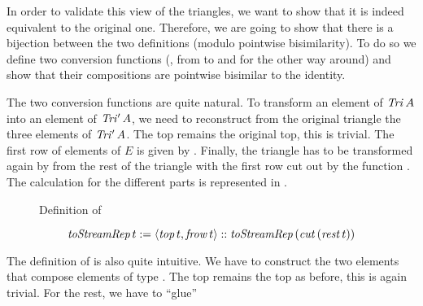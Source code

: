 In order to validate this view of the triangles, we want to show that
it is indeed equivalent to the original one. Therefore, we are going
to show that there is a bijection between the two definitions (modulo
pointwise bisimilarity). To do so we define two conversion functions
(\tSR{}, from \Tri{} to \TriS{} and \fSR{} for the other way around) and show that their
compositions are pointwise bisimilar to the identity.

The two conversion functions are quite natural. To transform an
element of $\mathit{Tri}\,A$ into an element of $\mathit{Tri'}\,A$, we need to reconstruct from
the original triangle the three elements of $\mathit{Tri'}\,A$. The top remains
the original top, this is trivial. The first row of elements of $E$ is given by \frow. Finally,
the triangle has to be transformed again by \tSR{} from the rest of
the triangle with the first row cut out by the function \cut. The
calculation for the different parts is represented in . 
\begin{figure}[h]
  \centering
  \vspace{-3ex}
  \caption{Definition of \tSR}
  \label{fig:tSR}
\end{figure}
\begin{definition}\label{def:tSR}
  $$\mathit{toStreamRep}\,t := \langle \mathit{top}\,t,\mathit{frow}\,t\rangle :: \mathit{toStreamRep} \,(\mathit{cut}\, (\mathit{rest}\,t))$$
\end{definition}
The definition of \fSR{} is also quite intuitive. We have to construct
the two elements that compose elements of type \Tri{}. The top remains
the top as before, this is again trivial. For the rest, we have to ``glue''
